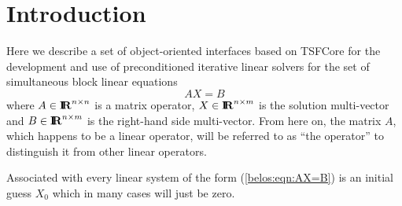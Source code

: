 \documentclass[pdf,ps2pdf,11pt]{SANDreport}
\begin{document}


%
\SANDmain %

\section{Introduction}

Here we describe a set of object-oriented interfaces based on TSFCore
{}\cite{ref:TSFCore} for the development and use of preconditioned
iterative linear solvers for the set of simultaneous block linear
equations
%
\begin{equation}
A X = B
\label{belos:eqn:AX=B}
\end{equation}
%
{}\noindent{}where $A\in\mbox{\textbf{I}}\hspace{-0.6ex}\mbox{\textbf{R}}^{n {}\times n}$ is a matrix operator,
$X\in\mbox{\textbf{I}}\hspace{-0.6ex}\mbox{\textbf{R}}^{n {}\times m}$ is the solution multi-vector and $B\in\mbox{\textbf{I}}\hspace{-0.6ex}\mbox{\textbf{R}}^{n
{}\times m}$ is the right-hand side multi-vector.  From here on, the
matrix $A$, which happens to be a linear operator, will be referred to
as ``the operator'' to distinguish it from other linear operators.

Associated with every linear system of the form (\ref{belos:eqn:AX=B})
is an initial guess $X_0$ which in many cases will just be zero.
\end{document}
